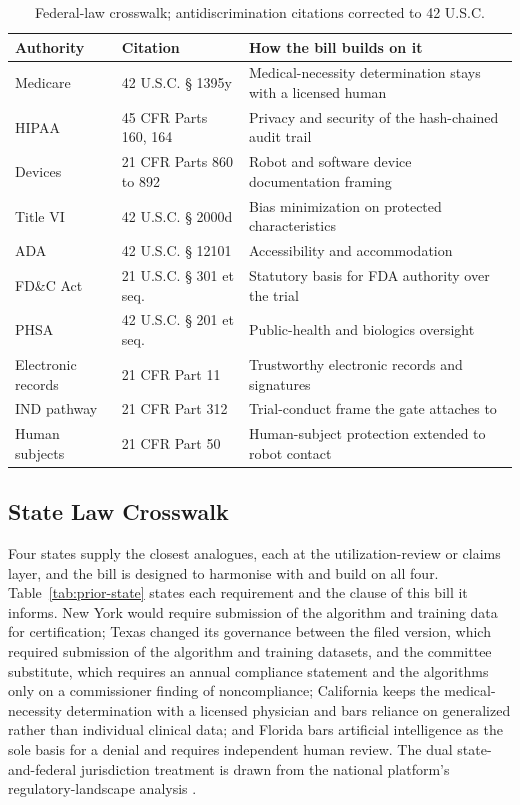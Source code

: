 \begin{table}[ht]
\centering
\begin{tabularx}{\textwidth}{L{2.8cm} L{3.5cm} Y}
\toprule
\textbf{Authority} & \textbf{Citation} & \textbf{How the bill builds on it} \\
\midrule
Medicare \cite{usc-1395y} & 42 U.S.C. § 1395y & Medical-necessity determination stays with a licensed human \\
HIPAA \cite{cfr-hipaa} & 45 CFR Parts 160, 164 & Privacy and security of the hash-chained audit trail \\
Devices \cite{cfr-devices} & 21 CFR Parts 860 to 892 & Robot and software device documentation framing \\
Title VI \cite{usc-titlevi} & 42 U.S.C. § 2000d & Bias minimization on protected characteristics \\
ADA \cite{usc-ada} & 42 U.S.C. § 12101 & Accessibility and accommodation \\
FD\&C Act \cite{usc-fdca} & 21 U.S.C. § 301 et seq. & Statutory basis for FDA authority over the trial \\
PHSA \cite{usc-phsa} & 42 U.S.C. § 201 et seq. & Public-health and biologics oversight \\
Electronic records \cite{cfr-part11} & 21 CFR Part 11 & Trustworthy electronic records and signatures \\
IND pathway \cite{cfr-part312} & 21 CFR Part 312 & Trial-conduct frame the gate attaches to \\
Human subjects \cite{cfr-part50} & 21 CFR Part 50 & Human-subject protection extended to robot contact \\
\bottomrule
\end{tabularx}
\caption{Federal-law crosswalk; antidiscrimination citations corrected to 42 U.S.C.}
\label{tab:prior-federal}
\end{table}

\subsection{State Law Crosswalk}

Four states supply the closest analogues, each at the utilization-review or
claims layer, and the bill is designed to harmonise with and build on all four.
Table~\ref{tab:prior-state} states each requirement and the clause of this bill it
informs. New York would require submission of the algorithm and training data for
certification; Texas changed its governance between the filed version, which
required submission of the algorithm and training datasets, and the committee
substitute, which requires an annual compliance statement and the algorithms only
on a commissioner finding of noncompliance; California keeps the medical-necessity
determination with a licensed physician and bars reliance on generalized rather
than individual clinical data; and Florida bars artificial intelligence as the
sole basis for a denial and requires independent human review. The dual
state-and-federal jurisdiction treatment is drawn from the national platform's
regulatory-landscape analysis \cite{kawchak2026national}.

